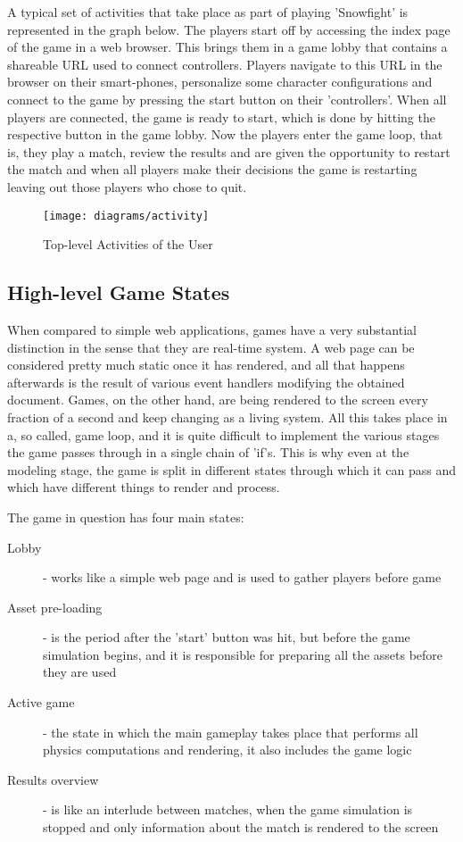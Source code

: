 A typical set of activities that take place as part of playing 'Snowfight' is
represented in the graph below. The players start off by accessing the index
page of the game in a web browser. This brings them in a game lobby that
contains a shareable URL used to connect controllers. Players navigate to this
URL in the browser on their smart-phones, personalize some character
configurations and connect to the game by pressing the start button on their
'controllers'. When all players are connected, the game is ready to start, which
is done by hitting the respective button in the game lobby. Now the players
enter the game loop, that is, they play a match, review the results and are
given the opportunity to restart the match and when all players make their
decisions the game is restarting leaving out those players who chose to quit.

\begin{figure}[!h]
\centering
\texttt{[image: diagrams/activity]}
\caption{Top-level Activities of the User}\label{diag:activity}
\end{figure}

\newpage

\subsection{High-level Game States}

When compared to simple web applications, games have a very substantial
distinction in the sense that they are real-time system. A web page can be
considered pretty much static once it has rendered, and all that happens
afterwards is the result of various event handlers modifying the obtained
document. Games, on the other hand, are being rendered to the screen every
fraction of a second and keep changing as a living system. All this takes place
in a, so called, game loop, and it is quite difficult to implement the various
stages the game passes through in a single chain of 'if's. This is why even at
the modeling stage, the game is split in different states through which it can
pass and which have different things to render and process.

The game in question has four main states:

\begin{description}
	\item [Lobby] - works like a simple web page and is used to gather players before game
	\item [Asset pre-loading] - is the period after the 'start' button was hit, but before the game simulation begins, and it is responsible for preparing all the assets before they are used
	\item [Active game] - the state in which the main gameplay takes place that performs all physics computations and rendering, it also includes the game logic
	\item [Results overview] - is like an interlude between matches, when the game simulation is stopped and only information about the match is rendered to the screen
\end{description}

